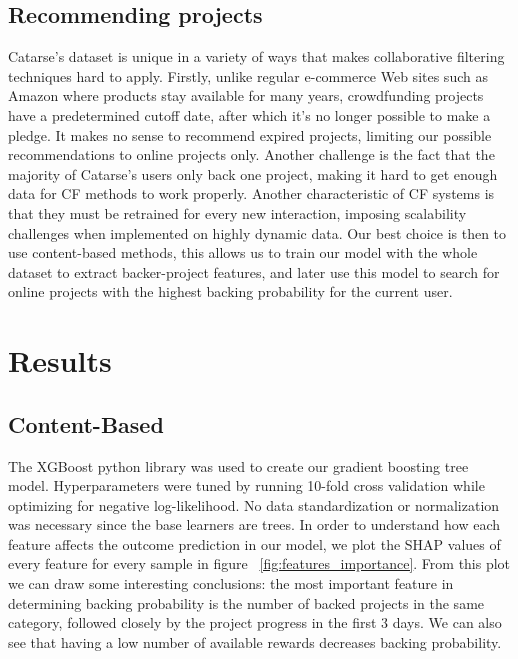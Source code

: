 \documentclass[cic,tc,english]{iiufrgs}
\begin{document}
\section{Recommending projects}
Catarse's dataset is unique in a variety of ways that makes collaborative filtering techniques hard to apply. Firstly, unlike regular e-commerce Web sites such as Amazon where products stay available for many years, crowdfunding projects have a predetermined cutoff date, after which it's no longer possible to make a pledge. It makes no sense to recommend expired projects, limiting our possible recommendations to online projects only. Another challenge is the fact that the majority of Catarse's users only back one project, making it hard to get enough data for CF methods to work properly. Another characteristic of CF systems is that they must be retrained for every new interaction, imposing scalability challenges when implemented on highly dynamic data. Our best choice is then to use content-based methods, this allows us to train our model with the whole dataset to extract backer-project features, and later use this model to search for online projects with the highest backing probability for the current user.




\chapter{Results}
\section{Content-Based}
The XGBoost python library was used to create our gradient boosting tree model. Hyperparameters were tuned by running 10-fold cross validation while optimizing for negative log-likelihood. No data standardization or normalization was necessary since the base learners are trees. In order to understand how each feature affects the outcome prediction in our model, we plot the SHAP \cite{Lundberg2017} values of every feature for every sample in figure ~\ref{fig:features_importance}. From this plot we can draw some interesting conclusions: the most important feature in determining backing probability is the number of backed projects in the same category, followed closely by the project progress in the first 3 days. We can also see that having a low number of available rewards decreases backing probability.
\end{document}
